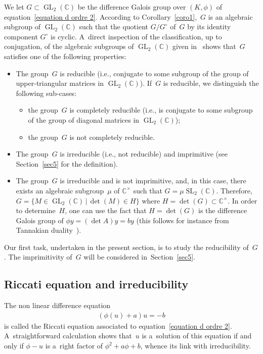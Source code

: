 \documentclass[11pt]{article}
\numberwithin{equation}{section}
\begin{document}
We let $G \subset \operatorname{GL}_{2}(\mathbb C)$ be the dif\/ference Galois group over $(K,\phi)$ of
equation~\eqref{equation d ordre 2}.
According to Corollary~\ref{coro1},~$G$ is an algebraic subgroup of $\operatorname{GL}_{2}(\mathbb C)$ such that the
quotient $G/G^{\circ}$ of~$G$ by its identity component $G^{\circ}$ is cyclic.
A~direct inspection of the classif\/ication, up to conjugation, of the algebraic subgroups of
$\operatorname{GL}_{2}(\mathbb C)$ given in~\cite[Theorem~4]{NvdPT} shows that~$G$ satisf\/ies one of the following
properties:
\begin{itemize}
\itemsep=0pt
\item The group~$G$ is reducible (i.e., conjugate to some subgroup of the group of upper-triangular matrices in
$\operatorname{GL}_{2}(\mathbb C)$).
If~$G$ is reducible, we distinguish the following sub-cases:
\begin{itemize}\itemsep=0pt
\item the group~$G$ is completely reducible (i.e., is conjugate to some subgroup of the group of diagonal matrices
in $\operatorname{GL}_{2}(\mathbb C)$);
\item the group~$G$ is not completely reducible.
\end{itemize}
\item The group~$G$ is irreducible (i.e., not reducible) and imprimitive (see Section~\ref{sec5} for the def\/inition).
\item The group~$G$ is irreducible and is not imprimitive, and, in this case, there exists an algebraic subgroup~$\mu$
of $\mathbb C^{\times}$ such that $G= \mu \operatorname{SL}_{2}(\mathbb C)$.
Therefore, $G= \{M \in \operatorname{GL}_{2}(\mathbb C) \, \vert \, \det(M) \in H\}$ where $H=\det(G) \subset \mathbb
C^{\times}$.
In order to determine~$H$, one can use the fact that $H=\det(G)$ is the dif\/ference Galois group of $\phi y = (\det A) y
= by$ (this follows for instance from Tannakian duality~\cite[Section~1.4]{VdPS97}).
\end{itemize}

Our f\/irst task, undertaken in the present section, is to study the reducibility of~$G$.
The imprimitivity of~$G$ will be considered in~Section~\ref{sec5}.

\subsection{Riccati equation and irreducibility}

The non linear dif\/ference equation
\begin{gather}
\label{eq4}
(\phi(u)+a) u=-b
\end{gather}
is called the Riccati equation associated to equation~\eqref{equation d ordre 2}.
A~straightforward calculation shows that~$u$ is a~solution of this equation if and only if $\phi-u$ is a~right factor of
$\phi^{2}+a\phi+b$, whence its link with irreducibility.
\end{document}
